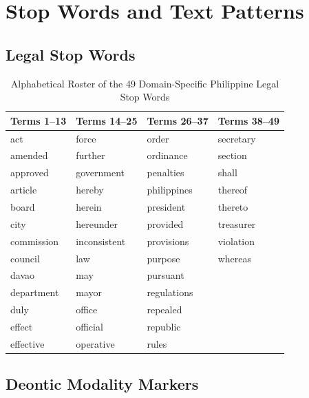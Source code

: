 \chapter{Stop Words and Text Patterns}
\label{app:lexicons_stopwords}

\section{Legal Stop Words}
\label{sec:app_legal_stopwords_roster}

\begin{table}[htbp]
    \centering
    \footnotesize
    \setlength{\tabcolsep}{6.0pt}
    \renewcommand{\arraystretch}{0.95}
    \caption[Alphabetical Roster of Philippine Legal Stop Words]{Alphabetical Roster of the 49 Domain-Specific Philippine Legal Stop Words}
    \label{tab:app_legal_stopwords}
    \begin{tabularx}{\linewidth}{XXXX}
        \toprule
        \textbf{Terms 1--13} & \textbf{Terms 14--25} & \textbf{Terms 26--37} & \textbf{Terms 38--49} \\
        \midrule
        act & force & order & secretary \\
        amended & further & ordinance & section \\
        approved & government & penalties & shall \\
        article & hereby & philippines & thereof \\
        board & herein & president & thereto \\
        city & hereunder & provided & treasurer \\
        commission & inconsistent & provisions & violation \\
        council & law & purpose & whereas \\
        davao & may & pursuant & \\
        department & mayor & regulations & \\
        duly & office & repealed & \\
        effect & official & republic & \\
        effective & operative & rules & \\
        \bottomrule
    \end{tabularx}
\end{table}

\section{Deontic Modality Markers}
\label{sec:app_deontic_lexicons}

